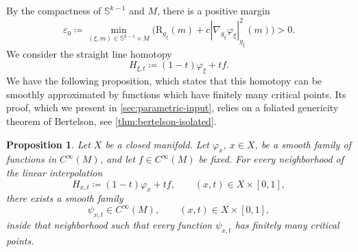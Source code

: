 \documentclass[11pt]{amsart}
\numberwithin{equation}{section}
\newtheorem{proposition}[theorem]{Proposition}
\newcommand{\scal}{\mathrm{R}}
\begin{document}
By the compactness of $\mathbb S^{k-1}$ and $M$, there is a positive margin
\begin{equation}\label{eq:initial-margin}
 \varepsilon_0\coloneqq \min_{(\xi,m)\in\mathbb S^{k-1}\times M}\bigl(\scal_{g_\xi}(m)+c|\nabla_{g_\xi}\varphi_\xi|_{g_\xi}^2(m)\bigr)>0.
\end{equation}
We consider the straight line homotopy
\[
H_{\xi,t}\coloneqq (1-t)\varphi_\xi + tf.
\]
We have the following proposition, which states that this homotopy can be smoothly approximated by functions which have finitely many critical points.
Its proof, which we present in \cref{sec:parametric-input}, relies on a foliated genericity theorem of Bertelson, see \cref{thm:bertelson-isolated}.

\begin{proposition}\label{cor:finite-critical-path}
Let $X$ be a closed manifold.
Let
$\varphi_x$, $x\in X$, be a smooth family of functions in $C^\infty(M)$, and let $f\in C^\infty(M)$ be fixed.
For every neighborhood of the linear interpolation
\[
 H_{x,t}\coloneqq (1-t)\varphi_x+t f,
 \qquad (x,t)\in X\times[0,1],
\]
there exists a smooth family
\[
 \psi_{x,t}\in C^\infty(M),
 \qquad (x,t)\in X\times[0,1],
\]
inside that neighborhood such that every function $\psi_{x,t}$ has finitely many critical points.
\end{proposition}
\end{document}
